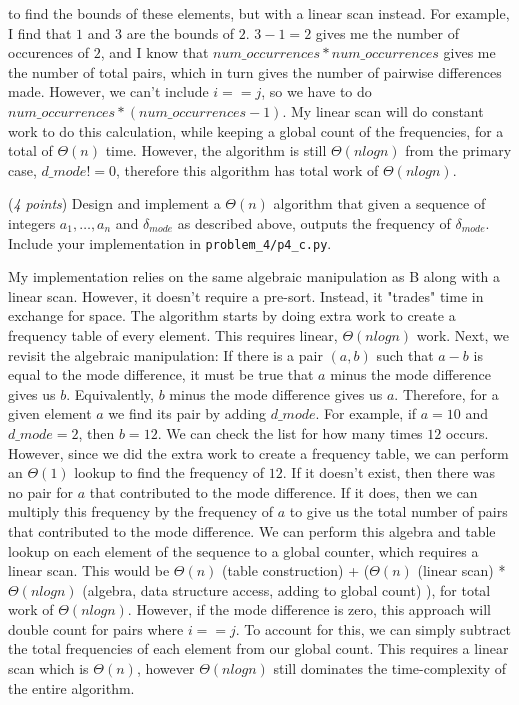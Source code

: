 \documentclass{hw_template}
\begin{document}
\begin{problem}
\begin{solution}
        to find the bounds of these elements, but with a linear scan instead. For example, I find that $1$ and $3$ are the bounds of $2$. $3-1=2$ gives me the number of occurences of $2$, and I know that 
        $num\_occurrences * num\_occurrences$ gives me the number of total pairs, which in turn gives the number of pairwise differences made. However, we can't include $i==j$, so we have to do $num\_occurrences * (num\_occurrences - 1)$.
        My linear scan will do constant work to do this calculation, while keeping a global count of the frequencies, for a total of $\Theta(n)$ time. However, the algorithm is still $\Theta(nlogn)$ from the primary case, $d\_mode != 0$, therefore this 
        algorithm has total work of $\Theta(nlogn)$.
    \end{solution}

  \begin{subproblem}
    (\textit{4 points})
    Design and implement a $\Theta(n)$ algorithm that given a sequence of integers $a_1,\ldots,a_n$ and $\delta_{mode}$ as described above, outputs the frequency of $\delta_{mode}$. Include your implementation in \texttt{problem\_4/p4\_c.py}.
  \end{subproblem}
    \begin{solution}
        My implementation relies on the same algebraic manipulation as B along with a linear scan. However, it doesn't require a pre-sort. Instead, it "trades" time in exchange for space. The algorithm 
        starts by doing extra work to create a frequency table of every element. This requires linear, $\Theta(nlogn)$ work. Next, we revisit the algebraic manipulation: If there is a pair $(a,b)$ such that 
        $a - b$ is equal to the mode difference, it must be true that $a$ minus the mode difference gives us $b$. Equivalently, $b$ minus the mode difference gives us $a$. Therefore, for a given element $a$ 
        we find its pair by adding $d\_mode$. For example, if $a=10$ and $d\_mode=2$, then $b=12$. We can check the list for how many times $12$ occurs. However, since we did the extra work to create a frequency table, 
        we can perform an $\Theta(1)$ lookup to find the frequency of $12$. If it doesn't exist, then there was no pair for $a$ that contributed to the mode difference. If it does, then we can multiply this frequency by 
        the frequency of $a$ to give us the total number of pairs that contributed to the mode difference. We can perform this algebra and table lookup on each element of the sequence to a global counter, which requires 
        a linear scan. This would be $\Theta(n)$ (table construction) + ($\Theta(n)$ (linear scan) * $\Theta(nlogn)$ (algebra, data structure access, adding to global count) ), for total work of $\Theta(nlogn)$.
        However, if the mode difference is zero, this approach will double count for pairs where $i == j$. To account for this, we can simply subtract the total frequencies of each element from our global count. 
        This requires a linear scan which is $\Theta(n)$, however $\Theta(nlogn)$ still dominates the time-complexity of the entire algorithm.


\end{solution}
\end{problem}
\end{document}

